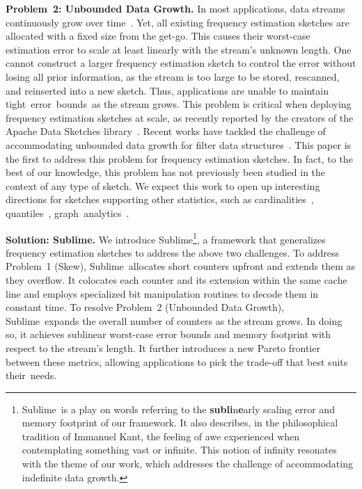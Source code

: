 \documentclass[sigconf]{acmart}
\newcommand{\sketch}{Sublime}
\begin{document}
\textbf{Problem~2: Unbounded Data Growth.}
In most applications, data streams continuously grow over time~\cite{Compass,QueryOptimizationSketches,ConvolutionSketch,SketchBasedChangeDetection,WhatsNew,TrafficManagementSurvey}.
Yet, all existing frequency estimation sketches are allocated with a fixed size from the get-go.
This causes their worst-case estimation error to scale at least linearly with the stream's unknown length.
One cannot construct a larger frequency estimation sketch to control the error without losing all prior information, as the stream is too large to be stored, rescanned, and reinserted into a new sketch.
Thus, applications are unable to maintain tight~error~bounds~as the stream grows.
This problem is critical when deploying frequency estimation sketches at scale, as recently reported by the creators of the Apache Data Sketches library~\cite{SimonsYahoo,DataSketches}.
Recent works have tackled the challenge of accommodating unbounded data growth for filter data structures~\cite{PaghExpandability,TaffyFilters,InfiniFilter,AlephFilter,Zeno,BeyondBloomTutorial,Memento,Diva,Aeris}.
This paper is the first to address this problem for frequency estimation sketches.
In fact, to the best of our knowledge, this problem has not previously been studied in the context of any type of sketch.
We expect this work to open up interesting directions for sketches supporting other statistics, such as cardinalities~\cite{HLL,HLLL,ULL}, quantiles~\cite{GK,KLL,SplineSketch}, graph~analytics~\cite{LpSamplers,AGM}.

\textbf{Solution: \sketch.}
We introduce \sketch\footnote{
    \sketch\ is a play on words referring to the \textbf{subli}n\textbf{e}arly scaling error and memory footprint of our framework.
    It also describes, in the philosophical tradition of Immanuel Kant, the feeling of awe experienced when contemplating something vast or infinite.
    This notion of infinity resonates with the theme of our work, which addresses the challenge of accommodating indefinite data growth.
}, a framework that generalizes frequency estimation sketches to address the above two challenges.
To address Problem~1 (Skew), \sketch\ allocates short counters upfront and extends them as they overflow.
It colocates each counter and its extension within the same cache line and employs specialized bit manipulation routines to decode them in constant time.
To resolve Problem~2 (Unbounded Data Growth), \sketch\ expands the overall number of counters as the stream grows.
In doing so, it achieves sublinear worst-case error bounds and memory footprint with respect to the stream's length.
It further introduces a new Pareto frontier between these metrics, allowing applications to pick the trade-off that best suits their~needs.
\end{document}
